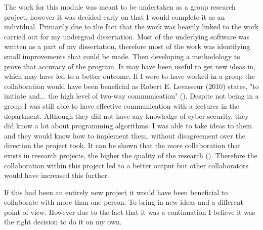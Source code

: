 The work for this module was meant to be undertaken as a group research project, however it was decided early on that I would complete it as an individual. Primarily due to the fact that the work was heavily linked to the work carried out for my undergrad dissertation. Most of the underlying software was written as a part of my dissertation, therefore most of the work was identifying small improvements that could be made. Then developing a methodology to prove that accuracy of the program. It may have been useful to get new ideas in, which may have led to a better outcome. If I were to have worked in a group the collaboration would have been beneficial as Robert E. Levasseur (2010) states, "to initiate and... the high level of two-way communication" (\cite{levasseur2010people}). Despite not being in a group I was still able to have effective communication with a lecturer in the department. Although they did not have any knowledge of cyber-security, they did know a lot about programming algorithms. I was able to take ideas to them and they would know how to implement them, without disagreement over the direction the project took. It can be shown that the more collaboration that exists in research projects, the higher the quality of the research (\cite{figg2006scientific}). Therefore the collaboration within this project led to a better output but other collaborators would have increased this further. 






If this had been an entirely new project it would have been beneficial to collaborate with more than one person. To bring in new ideas and a different point of view. However due to the fact that it was a continuation I believe it was the right decision to do it on my own.  